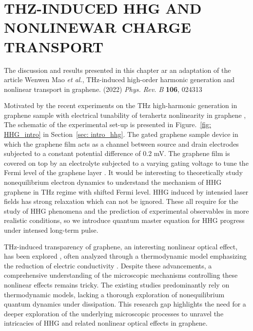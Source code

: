\chapter{THZ-INDUCED HHG AND NONLINEWAR CHARGE TRANSPORT \label{ch:ch4}}
The discussion and results presented in this chapter ar an adaptation of the article Wenwen Mao \emph{et al.}, THz-induced high-order harmonic generation and nonlinear transport in graphene. (2022) {\it Phys. Rev. B} \textbf{106}, 024313

\color{red}
Motivated by the recent experiments on the THz high-harmonic generation in graphene sample with electrical tunability of terahertz nonlinearity in graphene \cite{hafez2014nonlinear, kovalev2021electrical}, The schematic of the experimental set-up is presented in Figure.~\ref{fig: HHG_intro} in Section~\ref{sec: intro_hhg}. The gated graphene sample device in which the graphene film acts as a channel between source and drain electrodes subjected to a constant potential difference of 0.2 mV. The graphene film is covered on top by an electrolyte subjected to a varying gating voltage to tune the Fermi level of the graphene layer \cite{kovalev2021electrical}. It would be interesting to theoretically study nonequilibrium electron dynamics to understand the mechanism of HHG graphene in THz regime with shifted Fermi level.
HHG induced by intensied laser fields has strong relaxation which can not be ignored. These all require for the study of \gls{HHG} phenomena and the prediction of experimental observables in more realistic conditions, so we introduce quantum master equation for HHG progress under intensed long-term pulse.
\color{black}

THz-induced transparency of graphene, an interesting nonlinear optical effect, has been explored \cite{Hwang2013,Paul_2013,doi:10.1063/1.4902999}, often analyzed through a thermodynamic model emphasizing the reduction of electric conductivity \cite{mics2015thermodynamic,kovalev2021electrical}.
Despite these advancements, a comprehensive understanding of the microscopic mechanisms controlling these nonlinear effects remains tricky. The existing studies predominantly rely on thermodynamic models, lacking a thorough exploration of nonequilibrium quantum dynamics under dissipation. This research gap highlights the need for a deeper exploration of the underlying microscopic processes to unravel the intricacies of HHG and related nonlinear optical effects in graphene.

